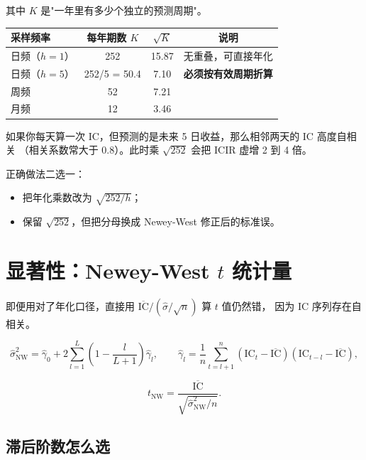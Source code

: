 其中 $K$ 是"一年里有多少个独立的预测周期"。

\begin{center}
\begin{tabular}{@{}lccc@{}}
\toprule
采样频率 & 每年期数 $K$ & $\sqrt{K}$ & 说明 \\
\midrule
日频（$h=1$） & 252 & 15.87 & 无重叠，可直接年化 \\
日频（$h=5$） & 252/5 = 50.4 & 7.10 & \textbf{必须按有效周期折算} \\
周频 & 52 & 7.21 & \\
月频 & 12 & 3.46 & \\
\bottomrule
\end{tabular}
\end{center}

\begin{warnbox}
如果你每天算一次 IC，但预测的是未来 5 日收益，那么相邻两天的 IC 高度自相关
（相关系数常大于 0.8）。此时乘 $\sqrt{252}$ 会把 ICIR 虚增 2 到 4 倍。

正确做法二选一：
\begin{itemize}
  \item 把年化乘数改为 $\sqrt{252/h}$；
  \item 保留 $\sqrt{252}$，但把分母换成 Newey-West 修正后的标准误。
\end{itemize}
\end{warnbox}

\section{显著性：Newey-West $t$ 统计量}

即便用对了年化口径，直接用 $\overline{\mathrm{IC}}/(\hat\sigma/\sqrt{n})$ 算 $t$ 值仍然错，
因为 IC 序列存在自相关。

\begin{equation}
  \hat\sigma^2_{\mathrm{NW}} = \hat\gamma_0 + 2\sum_{l=1}^{L}\left(1 - \frac{l}{L+1}\right)\hat\gamma_l,
  \qquad
  \hat\gamma_l = \frac{1}{n}\sum_{t=l+1}^{n}(\mathrm{IC}_t - \overline{\mathrm{IC}})(\mathrm{IC}_{t-l} - \overline{\mathrm{IC}}),
\end{equation}

\begin{equation}
  t_{\mathrm{NW}} = \frac{\overline{\mathrm{IC}}}{\sqrt{\hat\sigma^2_{\mathrm{NW}}/n}}.
\end{equation}

\subsection{滞后阶数怎么选}

